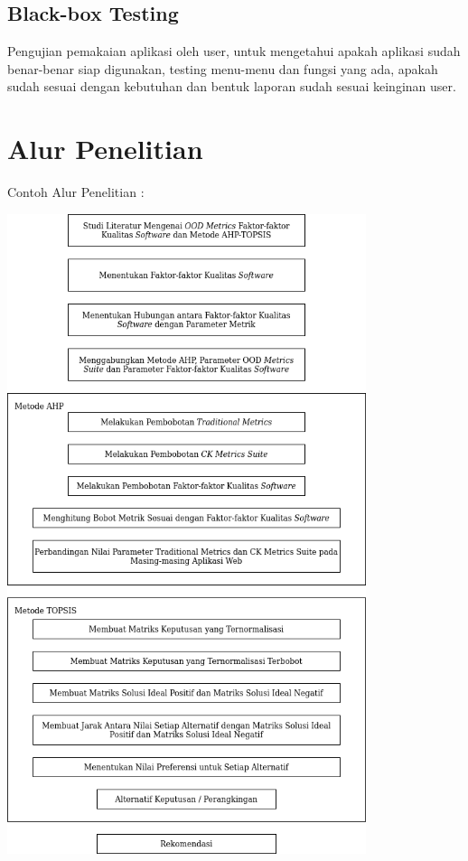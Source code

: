 \documentclass[oneside,listof=totoc]{scrbook}
\begin{document}
\subsection{Black-box Testing}
Pengujian pemakaian aplikasi oleh user, untuk mengetahui apakah aplikasi sudah benar-benar siap digunakan, testing menu-menu dan fungsi yang ada, apakah sudah sesuai dengan kebutuhan dan bentuk laporan sudah sesuai keinginan user.

\clearpage
\section{Alur Penelitian}
Contoh Alur Penelitian :

\vspace{0.5cm}

\begin{center}
  \begin{minipage}{\textwidth}
    \label{gambar:3.1}
    \hspace{1.8cm}
    \includegraphics[width=10.5cm]{gambar/gambar_3.1.png}
    \vspace{0.5cm}
  \end{minipage}
\end{center}
\end{document}
